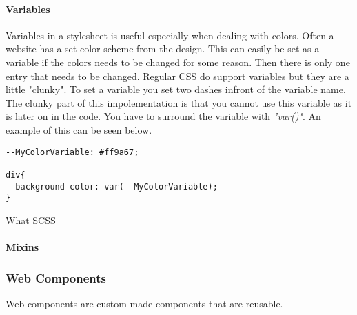 \paragraph{Variables}
Variables in a stylesheet is useful especially when dealing with colors. Often a website has a set color scheme from the design. This can easily be set as a variable if the colors needs to be changed for some reason. Then there is only one entry that needs to be changed. Regular CSS do support variables but they are a little "clunky". To set a variable you set two dashes infront of the variable name. The clunky part of this impolementation is that you cannot use this variable as it is later on in the code. You have to surround the variable with \textit{"var()"}. An example of this can be seen below.

\begin{lstlisting}[style=htmlcssjs]
--MyColorVariable: #ff9a67; 

div{
  background-color: var(--MyColorVariable);
}
\end{lstlisting}

What SCSS 


\paragraph{Mixins}








\subsubsection{Web Components}%
\label{sub:Web Components}
Web components are custom made components that are reusable.

